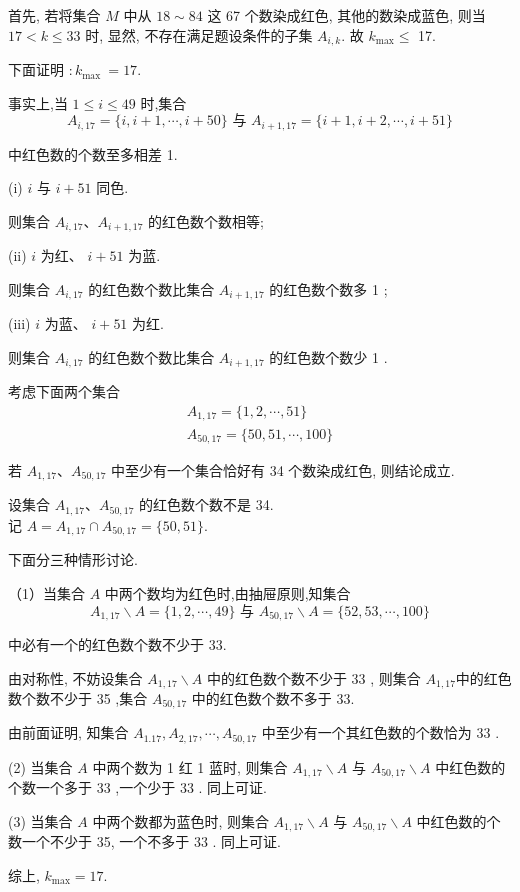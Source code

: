 \begin{solution}
	首先, 若将集合 $M$ 中从 $18 \sim 84$ 这 67 个数染成红色, 其他的数染成蓝色, 则当 $17<k \leqslant 33$ 时, 显然, 不存在满足题设条件的子集 $A_{i, k}$. 故 $k_{\max } \leqslant$ 17.

	下面证明 $: k_{\text {max }}=17$.

	事实上,当 $1 \leqslant i \leqslant 49$ 时,集合
	$$
		A_{i, 17}=\{i, i+1, \cdots, i+50\} \text { 与 } A_{i+1,17}=\{i+1, i+2, \cdots, i+51\}
	$$

	中红色数的个数至多相差 1.

	(i) $i$ 与 $i+51$ 同色.

	则集合 $A_{i, 17} 、 A_{i+1,17}$ 的红色数个数相等;

	(ii) $i$ 为红、 $i+51$ 为蓝.

	则集合 $A_{i, 17}$ 的红色数个数比集合 $A_{i+1,17}$ 的红色数个数多 1 ;

	(iii) $i$ 为蓝、 $i+51$ 为红.

	则集合 $A_{i, 17}$ 的红色数个数比集合 $A_{i+1,17}$ 的红色数个数少 1 .

	考虑下面两个集合
	$$
		\begin{gathered}
			A_{1,17}=\{1,2, \cdots, 51\} \\
			A_{50,17}=\{50,51, \cdots, 100\}
		\end{gathered}
	$$

	若 $A_{1,17} 、 A_{50,17}$ 中至少有一个集合恰好有 34 个数染成红色, 则结论成立.

	设集合 $A_{1,17} 、 A_{50,17}$ 的红色数个数不是 34.\\
	记 $A=A_{1,17} \cap A_{50,17}=\{50,51\}$.

	下面分三种情形讨论.

	（1）当集合 $A$ 中两个数均为红色时,由抽屉原则,知集合
	$$
		A_{1,17} \backslash A=\{1,2, \cdots, 49\} \text { 与 } A_{50,17} \backslash A=\{52,53, \cdots, 100\}
	$$

	中必有一个的红色数个数不少于 33.

	由对称性, 不妨设集合 $A_{1,17} \backslash A$ 中的红色数个数不少于 33 , 则集合 $A_{1,17}$中的红色数个数不少于 35 ,集合 $A_{50,17}$ 中的红色数个数不多于 33.

	由前面证明, 知集合 $A_{1.17}, A_{2,17}, \cdots, A_{50,17}$ 中至少有一个其红色数的个数恰为 33 .

	(2) 当集合 $A$ 中两个数为 1 红 1 蓝时, 则集合 $A_{1,17} \backslash A$ 与 $A_{50,17} \backslash A$ 中红色数的个数一个多于 33 ,一个少于 33 . 同上可证.

	(3) 当集合 $A$ 中两个数都为蓝色时, 则集合 $A_{1,17} \backslash A$ 与 $A_{50,17} \backslash A$ 中红色数的个数一个不少于 35, 一个不多于 33 . 同上可证.

	综上, $k_{\max }=17$.
\end{solution}

